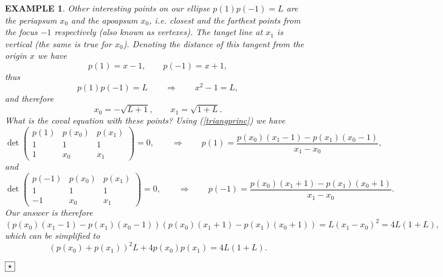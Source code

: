 \documentclass[10pt,a4paper,reqno]{amsart}
\newtheorem{exa}[defi]{\bf E\scriptsize XAMPLE \normalsize}
\def\kopr{\hfill\raisebox{3pt}{\framebox{$\star$}}}
\newenvironment{example}{\begin{exa}\rm}{$\kopr$\end{exa}}
\newcommand{\zav}[1]{\left( #1 \right)}
\newcommand{\deter}[1]{\det\zav{#1}}
\begin{document}
\begin{example}
Other interesting points on our ellipse $p(1)p(-1)=L$ are the periapsum $x_0$ and the apoapsum $x_0$, i.e. closest and the farthest points from the focus $-1$ respectively (also known as vertexes). The tanget line at $x_{1}$ is vertical (the same is true for $x_0$). Denoting the distance of this tangent from the origin $x$ we have
$$
p(1)=x-1,\qquad p(-1)=x+1,
$$
thus
$$
p(1)p(-1)=L \qquad \Longrightarrow \qquad x^2-1=L,
$$
and therefore
$$
x_0=-\sqrt{L+1},\qquad x_1=\sqrt{1+L}.
$$
What is the coval equation with these points? Using (\ref{triangprinc}) we have
$$
\deter{
\begin{array}{ccc}
p(1) & p(x_0) & p(x_1)   \\
1 & 1 & 1   \\
1 & x_0 & x_1 
\end{array}}=0,\qquad \Longrightarrow \qquad p(1)=\frac{p(x_0)(x_1-1)-p(x_1)(x_0-1)}{x_1-x_0},
$$
and
$$
\deter{
\begin{array}{ccc}
p(-1) & p(x_0) & p(x_1)   \\
1 & 1 & 1   \\
-1 & x_0 & x_1 
\end{array}}=0,\qquad \Longrightarrow \qquad p(-1)=\frac{p(x_0)(x_1+1)-p(x_1)(x_0+1)}{x_1-x_0}.
$$
Our answer is therefore
$$
\zav{p(x_0)(x_1-1)-p(x_1)(x_0-1)}\zav{p(x_0)(x_1+1)-p(x_1)(x_0+1)}=L(x_1-x_0)^2=4L(1+L),
$$
which can be simplified to
\begin{equation}
\zav{p(x_0)+p(x_1)}^2L+4p(x_0)p(x_1)=4L(1+L).
\end{equation}



\end{example}
\end{document}
